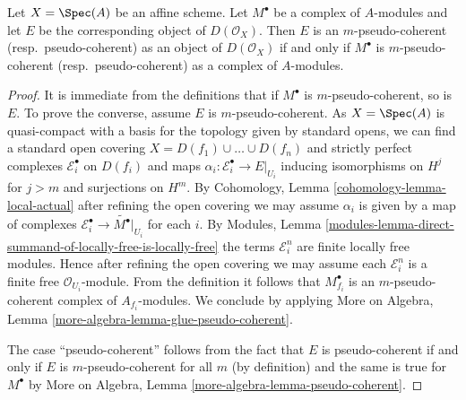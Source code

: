 \begin{lemma}
\label{lemma-pseudo-coherent-affine}
Let $X = \Spec(A)$ be an affine scheme. Let $M^\bullet$ be a
complex of $A$-modules and let $E$ be the corresponding object
of $D(\mathcal{O}_X)$. Then $E$ is an $m$-pseudo-coherent
(resp.\ pseudo-coherent) as an object of $D(\mathcal{O}_X)$
if and only if $M^\bullet$ is $m$-pseudo-coherent (resp.\ pseudo-coherent)
as a complex of $A$-modules.
\end{lemma}

\begin{proof}
It is immediate from the definitions that if $M^\bullet$ is
$m$-pseudo-coherent, so is $E$. To prove the converse, assume
$E$ is $m$-pseudo-coherent. As $X = \Spec(A)$ is quasi-compact with
a basis for the topology given by standard opens, we can find a standard
open covering $X = D(f_1) \cup \ldots \cup D(f_n)$ and strictly
perfect complexes $\mathcal{E}_i^\bullet$ on $D(f_i)$ and
maps $\alpha_i : \mathcal{E}_i^\bullet \to E|_{U_i}$ inducing
isomorphisms on $H^j$ for $j > m$ and surjections on $H^m$.
By Cohomology, Lemma \ref{cohomology-lemma-local-actual}
after refining the open covering
we may assume $\alpha_i$ is given by a map of complexes
$\mathcal{E}_i^\bullet \to \widetilde{M^\bullet}|_{U_i}$
for each $i$. By Modules, Lemma
\ref{modules-lemma-direct-summand-of-locally-free-is-locally-free}
the terms $\mathcal{E}_i^n$ are finite locally free modules.
Hence after refining the open covering we may assume each
$\mathcal{E}_i^n$ is a finite free $\mathcal{O}_{U_i}$-module.
From the definition it follows that $M^\bullet_{f_i}$ is
an $m$-pseudo-coherent complex of $A_{f_i}$-modules.
We conclude by applying
More on Algebra, Lemma \ref{more-algebra-lemma-glue-pseudo-coherent}.

\medskip\noindent
The case ``pseudo-coherent'' follows from the fact that $E$ is
pseudo-coherent if and only if $E$ is $m$-pseudo-coherent for
all $m$ (by definition) and the same is true for $M^\bullet$
by More on Algebra, Lemma \ref{more-algebra-lemma-pseudo-coherent}.
\end{proof}
